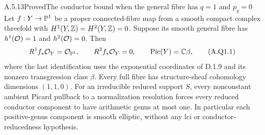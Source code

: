 \begin{statement}{A.5.13}{Proved}{The conductor bound when the general fibre has $q=1$ and $p_g=0$}
Let $f:Y\to\mathbb P^1$ be a proper connected-fibre map from
a smooth compact complex threefold with
$H^1(Y,\mathbb Z)=H^2(Y,\mathbb Z)=0$. Suppose its smooth general
fibre has $h^1(\mathcal O)=1$ and $h^2(\mathcal O)=0$.
Then
\[
 R^1f_*\mathcal O_Y=\mathcal O_{\mathbb P^1},\qquad R^2f_*\mathcal O_Y=0,
 \qquad\operatorname{Pic}(Y)=\mathbb C\beta,                            \tag{A.Q1.1}
\]
where the last identification uses the exponential
coordinates of D.1.9 and its nonzero transgression
class $\beta$. Every full fibre has structure-sheaf
cohomology dimensions $(1,1,0)$.
For an irreducible reduced support $S$, every
nonconstant ambient Picard pullback to a normalization
resolution forces every reduced conductor component
to have arithmetic genus at most one. In particular
each positive-genus component is smooth elliptic,
without any lci or conductor-reducedness hypothesis.
\end{statement}
